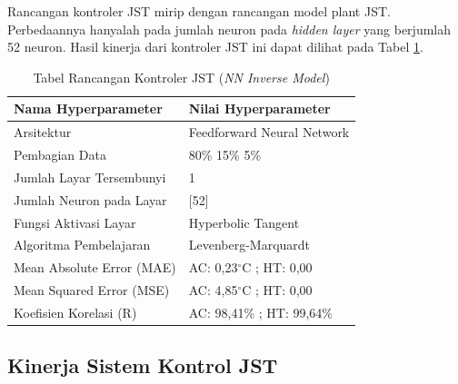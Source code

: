 Rancangan kontroler JST mirip dengan rancangan model plant JST. Perbedaannya hanyalah pada jumlah neuron pada \textit{hidden layer} yang berjumlah 52 neuron. Hasil kinerja dari kontroler JST ini dapat dilihat pada Tabel \ref{tbl:5:NNControler}.

\begin{table}[!h]
	\caption{Tabel Rancangan Kontroler JST (\textit{NN Inverse Model})}
	\label{tbl:5:NNControler}
	\centering
	\begin{tabular}{|p{5.7cm}|p{5cm}|}
		\hline
		\textbf{Nama Hyperparameter} & \textbf{Nilai Hyperparameter} \\ \hline
		Arsitektur & Feedforward Neural Network \\ \hline
		Pembagian Data & 80\% 15\% 5\% \\ \hline 
		Jumlah Layar Tersembunyi & 1 \\ \hline
		Jumlah Neuron pada Layar & [52] \\ \hline
		Fungsi Aktivasi Layar & Hyperbolic Tangent \\ \hline
		Algoritma Pembelajaran & Levenberg-Marquardt \\ \hline
		Mean Absolute Error (MAE) & AC: 0,23$^\circ$C ; HT: 0,00 \\ \hline
		Mean Squared Error (MSE) & AC: 4,85$^\circ$C ; HT: 0,00 \\ \hline
		Koefisien Korelasi (R) & AC: 98,41\% ; HT: 99,64\% \\ \hline
	\end{tabular}
\end{table}

\hfill\break
\hfill\break

\subsection{Kinerja Sistem Kontrol JST}

